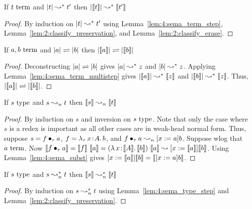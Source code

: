 \begin{lemma}
    \label{lem:4:sema_term_multistep}
    If $t~\textnormal{term}$ and $|t| \leadsto^* t^\prime$ then $|\llbracket t \rrbracket| \leadsto^* \llbracket t^\prime \rrbracket$
\end{lemma}
\begin{proof}
    By induction on $|t| \leadsto^* t^\prime$ using Lemma~\ref{lem:4:sema_term_step}, Lemma~\ref{lem:2:classify_preservation}, and Lemma~\ref{lem:2:classify_erase}.
\end{proof}

\begin{lemma}
    \label{lem:4:sema_term_conv}
    If $a, b~\textnormal{term}$ and $|a| \rightleftharpoons |b|$ then $|\llbracket a \rrbracket| \rightleftharpoons |\llbracket b \rrbracket|$
\end{lemma}
\begin{proof}
    Deconstructing $|a| \rightleftharpoons |b|$ gives $|a| \leadsto^* z$ and $|b| \leadsto^* z$.
    Applying Lemma~\ref{lem:4:sema_term_multistep} gives $|\llbracket a \rrbracket| \leadsto^* \llbracket z \rrbracket$ and $|\llbracket b \rrbracket| \leadsto^* \llbracket z \rrbracket$.
    Thus, $|\llbracket a \rrbracket| \rightleftharpoons |\llbracket b \rrbracket|$.
\end{proof}

\begin{lemma}
    \label{lem:4:sema_type_step}
    If $s~\textnormal{type}$ and $s \leadsto_n t$ then $\llbracket s \rrbracket \leadsto_n \llbracket t \rrbracket$
\end{lemma}
\begin{proof}
    By induction on $s$ and inversion on $s~\textnormal{type}$.
    Note that only the case where $s$ is a redex is important as all other cases are in weak-head normal form.
    Thus, suppose $s = f \bullet_{\tau} a$,  $f = {\lambda_\tau}\, x\! : \! A.\, b$, and $f \bullet_{\tau} a \leadsto_n [x := a]b$.
    Suppose wlog that $a~\textnormal{term}$.
    Now $\llbracket f \bullet_{\tau} a \rrbracket = \llbracket f \rrbracket\ \llbracket a \rrbracket = ({\lambda}\, x\! : \! \llbracket A \rrbracket.\, \llbracket b \rrbracket)\ \llbracket a \rrbracket \leadsto [x := \llbracket a \rrbracket]\llbracket b \rrbracket$.
    Using Lemma~\ref{lem:4:sema_subst} gives $[x := \llbracket a \rrbracket]\llbracket b \rrbracket = \llbracket [x := a]b \rrbracket$.
\end{proof}

\begin{lemma}
    \label{lem:4:sema_type_multistep}
    If $s~\textnormal{type}$ and $s \leadsto^*_n t$ then $\llbracket s \rrbracket \leadsto^*_n \llbracket t \rrbracket$
\end{lemma}
\begin{proof}
    By induction on $s \leadsto^*_n t$ using Lemma~\ref{lem:4:sema_type_step} and Lemma~\ref{lem:2:classify_preservation}.
\end{proof}

